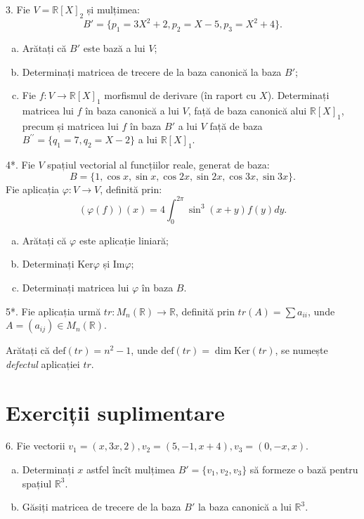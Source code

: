\documentclass[11pt,a4paper]{article}
\newcommand\RR{\mathbb{R}}
\theoremstyle{dotless}
\theoremstyle{dotlessdr}
\begin{document}
\vspace{1cm}

3. Fie $V = \RR[X]_2$ și mulțimea:
\[
  B' = \{ p_1 = 3X^2 + 2, p_2 = X - 5, p_3 = X^2 + 4 \}.
\]
\begin{enumerate}[(a)]
\item Arătați că $B'$ este bază a lui $V$;
\item Determinați matricea de trecere de la baza canonică la baza $B'$;
\item Fie $f : V \to \RR[X]_1$ morfismul de derivare (în raport cu $X$).
  Determinați matricea lui $f$ în baza canonică a lui $V$, față de baza canonică
  alui $\RR[X]_1$, precum și matricea lui $f$ în baza $B'$ a lui $V$
  față de baza $B^{\prime\prime} = \{ q_1 = 7, q_2 = X - 2 \}$ a lui $\RR[X]_1$.
\end{enumerate}

\vspace{1cm}

4*. Fie $V$ spațiul vectorial al funcțiilor reale, generat de baza:
\[
  B = \{1, \cos x, \sin x, \cos 2x, \sin 2x, \cos 3x, \sin 3x \}.
\]
Fie aplicația $\varphi : V \to V$, definită prin:
\[
  (\varphi(f))(x) = 4 \int_0^{2 \pi} \sin^3(x + y) f(y) dy.
\]
\begin{enumerate}[(a)]
\item Arătați că $\varphi$ este aplicație liniară;
\item Determinați $\mathrm{Ker}\varphi$ și $\mathrm{Im}\varphi$;
\item Determinați matricea lui $\varphi$ în baza $B$.
\end{enumerate}

\vspace{1cm}

5*. Fie aplicația urmă $tr : M_n(\RR) \to \RR$, definită prin $tr(A) = \sum a_{ii}$,
unde $A = (a_{ij}) \in M_n(\RR)$.

Arătați că $\mathrm{def}(tr) = n^2 - 1$, unde $\mathrm{def}(tr) = \dim \mathrm{Ker}(tr)$,
se numește \emph{defectul} aplicației $tr$.


\section{Exerciții suplimentare}
\label{sec:exc-supl}

6. Fie vectorii $v_1 = (x, 3x, 2), v_2 = (5, -1, x + 4), v_3 = (0, -x, x)$.
\begin{enumerate}[(a)]
\item Determinați $x$ astfel încît mulțimea $B' = \{ v_1, v_2, v_3 \}$ să formeze
  o bază pentru spațiul $\RR^3$.
\item Găsiți matricea de trecere de la baza $B'$ la baza canonică a lui $\RR^3$.
\end{enumerate}
\end{document}
